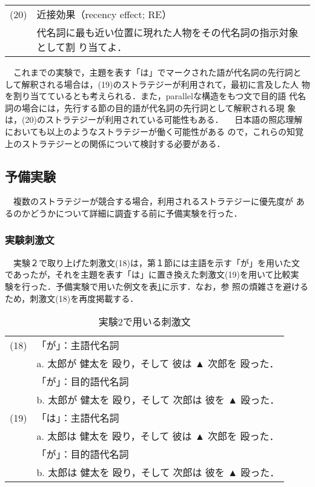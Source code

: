 \vspace{-2mm}
\begin{flushleft}
\begin{tabular}{cl}
(20)& 近接効果（recency effect; RE）\\
    & 代名詞に最も近い位置に現れた人物をその代名詞の指示対象として割
    り当てよ．\\
\end{tabular}
\end{flushleft}
\vspace{3mm}

　これまでの実験で，主題を表す「は」でマークされた語が代名詞の先行詞と
して解釈される場合は，(19)のストラテジーが利用されて，最初に言及した人
物を割り当てているとも考えられる．また，parallelな構造をもつ文で目的語
代名詞の場合には，先行する節の目的語が代名詞の先行詞として解釈される現
象は，(20)のストラテジーが利用されている可能性もある．
　日本語の照応理解においても以上のようなストラテジーが働く可能性がある
ので，これらの知覚上のストラテジーとの関係について検討する必要がある．

\subsection{予備実験}
　複数のストラテジーが競合する場合，利用されるストラテジーに優先度が
あるのかどうかについて詳細に調査する前に予備実験を行った．

\subsubsection{実験刺激文}
　実験２で取り上げた刺激文(18)は，第１節には主語を示す「が」を用いた文
であったが，それを主題を表す「は」に置き換えた刺激文(19)を用いて比較実
験を行った．予備実験で用いた例文を表\ref{table:exam2bs}に示す．なお，参
照の煩雑さを避けるため，刺激文(18)を再度掲載する．

\vspace{-3mm}
\begin{table}[htbp]
\begin{center}
\caption{実験2で用いる刺激文}
\label{table:exam2bs}
\vspace{-2mm}
\begin{tabular}{cl}\hline
(18) &「が」：主語代名詞\\
     & a. 太郎が  健太を 殴り，そして 彼は ▲ 次郎を 殴った．\\
     &「が」：目的語代名詞\\
     & b. 太郎が  健太を 殴り，そして 次郎は 彼を ▲ 殴った．\\
(19) &「は」：主語代名詞\\
     & a. 太郎は  健太を 殴り，そして 彼は ▲ 次郎を 殴った．\\
     &「が」：目的語代名詞\\
     & b. 太郎は  健太を 殴り，そして 次郎は 彼を ▲ 殴った．\\ \hline
\end{tabular}
\end{center}
\end{table}
\vspace{-3mm}

